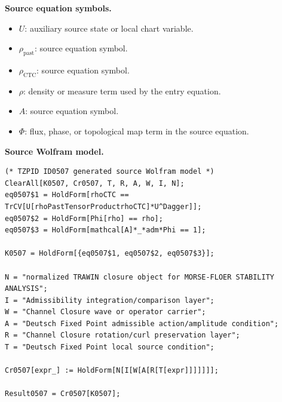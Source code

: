 \begin{minipage}[t]{0.49\linewidth}
\begingroup
\small
\raggedright
\textbf{Source equation symbols.}\par
\begin{itemize}[leftmargin=1.35em,itemsep=1pt,topsep=1pt,parsep=0pt]
    \item $U$: auxiliary source state or local chart variable.
    \item $\rho_{\mathrm{past}}$: source equation symbol.
    \item $\rho_{\mathrm{CTC}}$: source equation symbol.
    \item $\rho$: density or measure term used by the entry equation.
    \item $A$: source equation symbol.
    \item $\Phi$: flux, phase, or topological map term in the source equation.
\end{itemize}
\endgroup
\end{minipage}\hfill
\begin{minipage}[t]{0.47\linewidth}
\begingroup
\scriptsize
\raggedright
\textbf{Source Wolfram model.}\par
\begin{Verbatim}[fontsize=\tiny,breaklines=true,breakanywhere=true]
(* TZPID ID0507 generated source Wolfram model *)
ClearAll[K0507, Cr0507, T, R, A, W, I, N];
eq0507$1 = HoldForm[rhoCTC == TrCV[U[rhoPastTensorProductrhoCTC]*U^Dagger]];
eq0507$2 = HoldForm[Phi[rho] == rho];
eq0507$3 = HoldForm[mathcal[A]*_*adm*Phi == 1];

K0507 = HoldForm[{eq0507$1, eq0507$2, eq0507$3}];

N = "normalized TRAWIN closure object for MORSE-FLOER STABILITY ANALYSIS";
I = "Admissibility integration/comparison layer";
W = "Channel Closure wave or operator carrier";
A = "Deutsch Fixed Point admissible action/amplitude condition";
R = "Channel Closure rotation/curl preservation layer";
T = "Deutsch Fixed Point local source condition";

Cr0507[expr_] := HoldForm[N[I[W[A[R[T[expr]]]]]]];

Result0507 = Cr0507[K0507];
\end{Verbatim}
\endgroup
\end{minipage}

